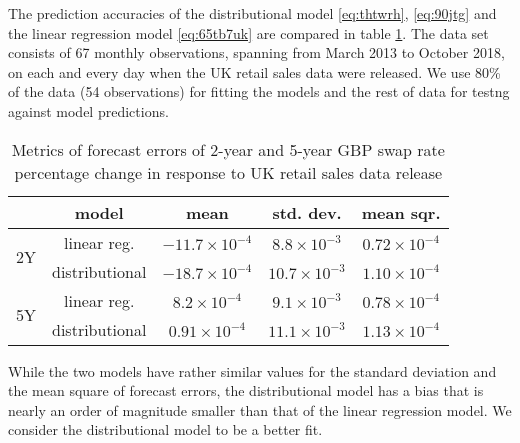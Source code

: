 \documentclass[a4paper,11pt,pdftex,twoside,titlepage]{article}
\begin{document}
The prediction accuracies of the distributional model
\eqref{eq:thtwrh}, \eqref{eq:90jtg} and the linear regression model
\eqref{eq:65tb7uk} are compared in table \ref{tab:j7j7j1}. The data
set consists of 67 monthly observations, spanning from March 2013 to
October 2018, on each and every day when the UK retail sales data were
released. We use 80\% of the data (54 observations) for fitting the
models and the rest of data for testng against model predictions.
\begin{table}[htb!]
  \centering
  \begin{tabular}{c|c|c|c|c}
    & model & mean & std. dev. & mean sqr. \\
    \hline
    \multirow{2}{*}{2Y} & linear reg. & $-11.7 \times 10^{-4}$ & $8.8 \times 10^{-3}$ & $0.72 \times 10^{-4}$ \\
    & distributional & $-18.7 \times 10^{-4}$ & $10.7 \times 10^{-3}$ & $1.10 \times 10^{-4}$\\
    \hline
    \hline
    \multirow{2}{*}{5Y} & linear reg. & $8.2 \times 10^{-4}$ & $9.1 \times 10^{-3}$ & $0.78 \times 10^{-4}$ \\
    & distributional & $0.91 \times 10^{-4}$ & $11.1 \times 10^{-3}$ & $1.13 \times 10^{-4}$\\
    \hline
  \end{tabular}
  \caption{Metrics of forecast errors of 2-year and 5-year GBP swap
    rate percentage change in response to UK retail sales data
    release}
  \label{tab:j7j7j1}
\end{table}
While the two models have rather similar values for the standard
deviation and the mean square of forecast errors, the distributional
model has a bias that is nearly an order of magnitude smaller than
that of the linear regression model. We consider the distributional
model to be a better fit.
\end{document}
